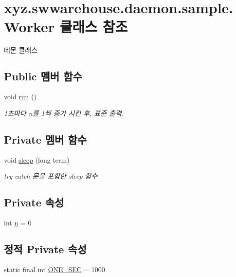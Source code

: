 \hypertarget{classxyz_1_1swwarehouse_1_1daemon_1_1sample_1_1_worker}{\section{xyz.\-swwarehouse.\-daemon.\-sample.\-Worker 클래스 참조}
\label{classxyz_1_1swwarehouse_1_1daemon_1_1sample_1_1_worker}
}


데몬 클래스  


\subsection*{Public 멤버 함수}
\begin{DoxyCompactItemize}
\item 
void \hyperlink{classxyz_1_1swwarehouse_1_1daemon_1_1sample_1_1_worker_af1bf199e3277a2946e59c7acc5416731}{run} ()
\begin{DoxyCompactList}\small\item\em 1초마다 n를 1씩 증가 시킨 후, 표준 출력. \end{DoxyCompactList}\end{DoxyCompactItemize}
\subsection*{Private 멤버 함수}
\begin{DoxyCompactItemize}
\item 
void \hyperlink{classxyz_1_1swwarehouse_1_1daemon_1_1sample_1_1_worker_ae9991783aa9ada529a18ecb5abdb4ad7}{sleep} (long term)
\begin{DoxyCompactList}\small\item\em try-\/catch 문을 포함한 sleep 함수 \end{DoxyCompactList}\end{DoxyCompactItemize}
\subsection*{Private 속성}
\begin{DoxyCompactItemize}
\item 
int \hyperlink{classxyz_1_1swwarehouse_1_1daemon_1_1sample_1_1_worker_aba3c26c1febb4e19bfc9562306bcee80}{n} = 0
\end{DoxyCompactItemize}
\subsection*{정적 Private 속성}
\begin{DoxyCompactItemize}
\item 
static final int \hyperlink{classxyz_1_1swwarehouse_1_1daemon_1_1sample_1_1_worker_a285c9ea5eebf4bb083140ca18048961a}{O\-N\-E\-\_\-\-S\-E\-C} = 1000
\end{DoxyCompactItemize}


